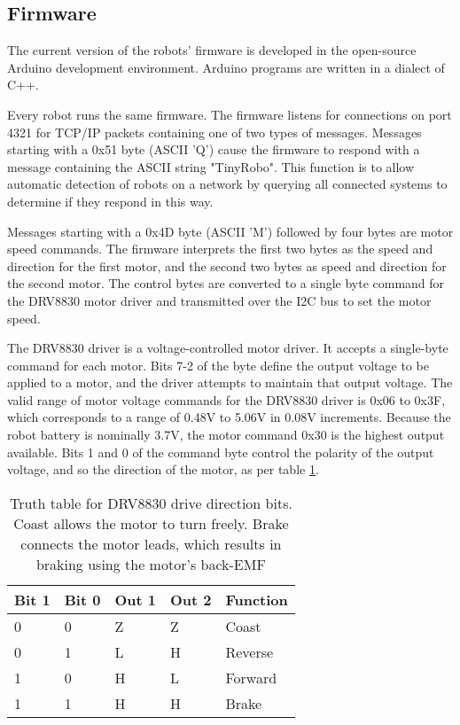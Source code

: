 \documentclass[]{article}
\begin{document}
\subsection {Firmware}

The current version of the robots' firmware is developed in the open-source Arduino development environment.
Arduino programs are written in a dialect of C++. 

Every robot runs the same firmware. 
The firmware listens for connections on port 4321 for TCP/IP packets containing one of two types of messages. 
Messages starting with a 0x51 byte (ASCII 'Q') cause the firmware to respond with a message containing the ASCII string "TinyRobo". 
This function is to allow automatic detection of robots on a network by querying all connected systems to determine if they respond in this way. 

Messages starting with a 0x4D byte (ASCII 'M') followed by four bytes are motor speed commands.
The firmware interprets the first two bytes as the speed and direction for the first motor, and the second two bytes as speed and direction for the second motor.
The control bytes are converted to a single byte command for the DRV8830 motor driver and transmitted over the I2C bus to set the motor speed.
 
The DRV8830 driver is a voltage-controlled motor driver. 
It accepts a single-byte command for each motor. 
Bits 7-2 of the byte define the output voltage to be applied to a motor, and the driver attempts to maintain that output voltage.
The valid range of motor voltage commands for the DRV8830 driver is 0x06 to 0x3F, which corresponds to a range of 0.48V to 5.06V in 0.08V increments. 
Because the robot battery is nominally 3.7V, the motor command 0x30 is the highest output available. 
Bits 1 and 0 of the command byte control the polarity of the output voltage, and so the direction of the motor, as per table \ref{tab:DRV8830_truth}.

\begin{table}
	\begin{tabular}{l l l l l}
	Bit 1 & Bit 0 & Out 1 & Out 2 & Function\\
	\hline
	0 & 0 & Z & Z & Coast\\
	0 & 1 & L & H & Reverse\\
	1 & 0 & H & L & Forward\\
	1 & 1 & H & H & Brake\\				
	\end{tabular}
	
	\caption{Truth table for DRV8830 drive direction bits. Coast allows the motor to turn freely. Brake connects the motor leads, which results in braking using the motor's back-EMF}
	\label{tab:DRV8830_truth}
\end{table}
\end{document}
